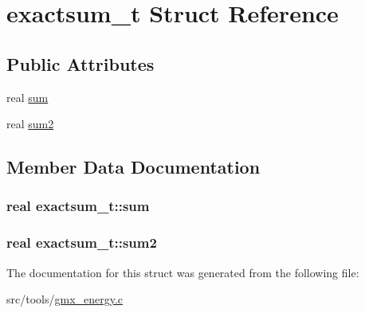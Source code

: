 \hypertarget{structexactsum__t}{\section{exactsum\-\_\-t \-Struct \-Reference}
\label{structexactsum__t}
}
\subsection*{\-Public \-Attributes}
\begin{DoxyCompactItemize}
\item 
real \hyperlink{structexactsum__t_ad161ac7fcf1440a4fa7841e29aa19a35}{sum}
\item 
real \hyperlink{structexactsum__t_ac306be0b0aad8d5699fdf9bcb191d29f}{sum2}
\end{DoxyCompactItemize}


\subsection{\-Member \-Data \-Documentation}
\hypertarget{structexactsum__t_ad161ac7fcf1440a4fa7841e29aa19a35}{
\subsubsection[{sum}]{\setlength{\rightskip}{0pt plus 5cm}real {\bf exactsum\-\_\-t\-::sum}}}\label{structexactsum__t_ad161ac7fcf1440a4fa7841e29aa19a35}
\hypertarget{structexactsum__t_ac306be0b0aad8d5699fdf9bcb191d29f}{
\subsubsection[{sum2}]{\setlength{\rightskip}{0pt plus 5cm}real {\bf exactsum\-\_\-t\-::sum2}}}\label{structexactsum__t_ac306be0b0aad8d5699fdf9bcb191d29f}


\-The documentation for this struct was generated from the following file\-:\begin{DoxyCompactItemize}
\item 
src/tools/\hyperlink{gmx__energy_8c}{gmx\-\_\-energy.\-c}\end{DoxyCompactItemize}
